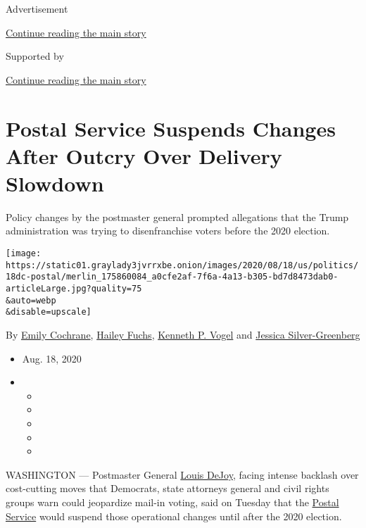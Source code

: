 Advertisement

\protect\hyperlink{after-top}{Continue reading the main story}

Supported by

\protect\hyperlink{after-sponsor}{Continue reading the main story}

\hypertarget{postal-service-suspends-changes-after-outcry-over-delivery-slowdown}{%
\section{Postal Service Suspends Changes After Outcry Over Delivery
Slowdown}\label{postal-service-suspends-changes-after-outcry-over-delivery-slowdown}}

Policy changes by the postmaster general prompted allegations that the
Trump administration was trying to disenfranchise voters before the 2020
election.

\texttt{[image: https://static01.graylady3jvrrxbe.onion/images/2020/08/18/us/politics/18dc-postal/merlin\_175860084\_a0cfe2af-7f6a-4a13-b305-bd7d8473dab0-articleLarge.jpg?quality=75\\\&auto=webp\\\&disable=upscale]}

By \href{https://www.nytimes3xbfgragh.onion/by/emily-cochrane}{Emily
Cochrane},
\href{https://www.nytimes3xbfgragh.onion/by/hailey-fuchs}{Hailey Fuchs},
\href{https://www.nytimes3xbfgragh.onion/by/kenneth-p-vogel}{Kenneth P.
Vogel} and
\href{https://www.nytimes3xbfgragh.onion/by/jessica-silver-greenberg}{Jessica
Silver-Greenberg}

\begin{itemize}
\item
  Aug. 18, 2020
\item
  \begin{itemize}
  \item
  \item
  \item
  \item
  \item
  \end{itemize}
\end{itemize}

WASHINGTON --- Postmaster General
\href{https://www.nytimes3xbfgragh.onion/article/general-louis-dejoy-postmaster.html}{Louis
DeJoy}, facing intense backlash over cost-cutting moves that Democrats,
state attorneys general and civil rights groups warn could jeopardize
mail-in voting, said on Tuesday that the
\href{https://www.nytimes3xbfgragh.onion/2020/08/22/business/economy/dejoy-postmaster-general-trump-mnuchin.html}{Postal
Service} would suspend those operational changes until after the 2020
election.

